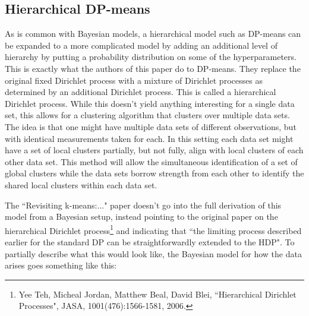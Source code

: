 \documentclass[11pt]{article}
\theoremstyle{definition}
\begin{document}
\subsection{Hierarchical DP-means}
As is common with Bayesian models, a hierarchical model such as DP-means can be expanded to a more complicated model by adding an additional level of hierarchy by putting a probability distribution on some of the hyperparameters. This is exactly what the authors of this paper do to DP-means. They replace the original fixed Dirichlet process with a mixture of Dirichlet processes as determined by an additional Dirichlet process. This is called a hierarchical Dirichlet process. While this doesn't yield anything interesting for a single data set, this allows for a clustering algorithm that clusters over multiple data sets. The idea is that one might have multiple data sets of different observations, but with identical measurements taken for each. In this setting each data set might have a set of local clusters partially, but not fully, align with local clusters of each other data set. This method will allow the simultaneous identification of a set of global clusters while the data sets borrow strength from each other to identify the shared local clusters within each data set. \par
The ``Revisiting k-means:..." paper doesn't go into the full derivation of this model from a Bayesian setup, instead pointing to the original paper on the hierarchical Dirichlet process\footnote{Yee Teh, Micheal Jordan, Matthew Beal, David Blei, ``Hierarchical Dirichlet Processes", JASA, 1001(476):1566-1581, 2006.} and indicating that ``the limiting process described earlier for the standard DP can be straightforwardly extended to the HDP". To partially describe what this would look like, the Bayesian model for how the data arises goes something like this:
\end{document}
